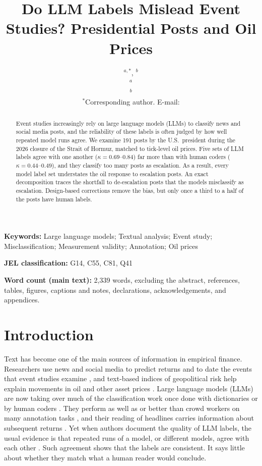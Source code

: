 \documentclass[12pt]{article}
\title{Do LLM Labels Mislead Event Studies? Presidential Posts and Oil Prices}
\author{\chk{Given-name Family-name}$^{a,*}$, \chk{Given-name Family-name}$^{b}$\\[1em]
\small $^{a}$\chk{Department, University, Postal address, Country}\\
\small $^{b}$\chk{Department, University, Postal address, Country}\\[0.5em]
\small $^{*}$Corresponding author. E-mail: \chk{institutional e-mail address}}
\date{}
\begin{document}
\maketitle

\begin{abstract}
\noindent Event studies increasingly rely on large language models (LLMs) to classify news and social media posts, and the reliability of these labels is often judged by how well repeated model runs agree. We examine 191 posts by the U.S.\ president during the 2026 closure of the Strait of Hormuz, matched to tick-level oil prices. Five sets of LLM labels agree with one another ($\kappa = 0.69$--$0.84$) far more than with human coders ($\kappa = 0.44$--$0.49$), and they classify too many posts as escalation. As a result, every model label set understates the oil response to escalation posts. An exact decomposition traces the shortfall to de-escalation posts that the models misclassify as escalation. Design-based corrections remove the bias, but only once a third to a half of the posts have human labels.
\end{abstract}

\noindent\textbf{Keywords:} Large language models; Textual analysis; Event study; Misclassification; Measurement validity; Annotation; Oil prices

\noindent\textbf{JEL classification:} G14, C55, C81, Q41

\noindent\textbf{Word count (main text):} 2,339 words, excluding the abstract, references, tables, figures, captions and notes, declarations, acknowledgements, and appendices.

\clearpage

\section{Introduction}

Text has become one of the main sources of information in empirical finance. Researchers use news and social media to predict returns and to date the events that event studies examine \citep{tetlock2007, loughran2011, loughran2016, gentzkow2019}, and text-based indices of geopolitical risk help explain movements in oil and other asset prices \citep{caldara2022}. Large language models (LLMs) are now taking over much of the classification work once done with dictionaries or by human coders \citep{ali2025}. They perform as well as or better than crowd workers on many annotation tasks \citep{gilardi2023}, and their reading of headlines carries information about subsequent returns \citep{lopezlira2026}. Yet when authors document the quality of LLM labels, the usual evidence is that repeated runs of a model, or different models, agree with each other \citep[e.g.,][]{garcia2026}. Such agreement shows that the labels are consistent. It says little about whether they match what a human reader would conclude.
\end{document}
